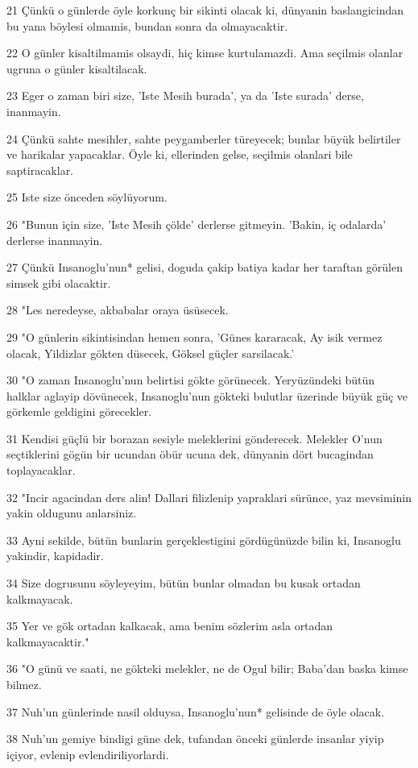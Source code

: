 \par 21 Çünkü o günlerde öyle korkunç bir sikinti olacak ki, dünyanin baslangicindan bu yana böylesi olmamis, bundan sonra da olmayacaktir.
\par 22 O günler kisaltilmamis olsaydi, hiç kimse kurtulamazdi. Ama seçilmis olanlar ugruna o günler kisaltilacak.
\par 23 Eger o zaman biri size, 'Iste Mesih burada', ya da 'Iste surada' derse, inanmayin.
\par 24 Çünkü sahte mesihler, sahte peygamberler türeyecek; bunlar büyük belirtiler ve harikalar yapacaklar. Öyle ki, ellerinden gelse, seçilmis olanlari bile saptiracaklar.
\par 25 Iste size önceden söylüyorum.
\par 26 "Bunun için size, 'Iste Mesih çölde' derlerse gitmeyin. 'Bakin, iç odalarda' derlerse inanmayin.
\par 27 Çünkü Insanoglu'nun* gelisi, doguda çakip batiya kadar her taraftan görülen simsek gibi olacaktir.
\par 28 "Les neredeyse, akbabalar oraya üsüsecek.
\par 29 "O günlerin sikintisindan hemen sonra, 'Günes kararacak, Ay isik vermez olacak, Yildizlar gökten düsecek, Göksel güçler sarsilacak.'
\par 30 "O zaman Insanoglu'nun belirtisi gökte görünecek. Yeryüzündeki bütün halklar aglayip dövünecek, Insanoglu'nun gökteki bulutlar üzerinde büyük güç ve görkemle geldigini görecekler.
\par 31 Kendisi güçlü bir borazan sesiyle meleklerini gönderecek. Melekler O'nun seçtiklerini gögün bir ucundan öbür ucuna dek, dünyanin dört bucagindan toplayacaklar.
\par 32 "Incir agacindan ders alin! Dallari filizlenip yapraklari sürünce, yaz mevsiminin yakin oldugunu anlarsiniz.
\par 33 Ayni sekilde, bütün bunlarin gerçeklestigini gördügünüzde bilin ki, Insanoglu yakindir, kapidadir.
\par 34 Size dogrusunu söyleyeyim, bütün bunlar olmadan bu kusak ortadan kalkmayacak.
\par 35 Yer ve gök ortadan kalkacak, ama benim sözlerim asla ortadan kalkmayacaktir."
\par 36 "O günü ve saati, ne gökteki melekler, ne de Ogul bilir; Baba'dan baska kimse bilmez.
\par 37 Nuh'un günlerinde nasil olduysa, Insanoglu'nun* gelisinde de öyle olacak.
\par 38 Nuh'un gemiye bindigi güne dek, tufandan önceki günlerde insanlar yiyip içiyor, evlenip evlendiriliyorlardi.
